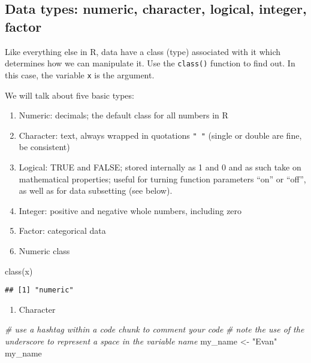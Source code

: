 \documentclass[
]{article}
\newenvironment{Shaded}{\begin{snugshade}}{\end{snugshade}}
\newcommand{\CommentTok}[1]{\textcolor[rgb]{0.56,0.35,0.01}{\textit{#1}}}
\newcommand{\FunctionTok}[1]{\textcolor[rgb]{0.00,0.00,0.00}{#1}}
\newcommand{\NormalTok}[1]{#1}
\newcommand{\OtherTok}[1]{\textcolor[rgb]{0.56,0.35,0.01}{#1}}
\newcommand{\StringTok}[1]{\textcolor[rgb]{0.31,0.60,0.02}{#1}}
\providecommand{\tightlist}{%
  \setlength{\itemsep}{0pt}\setlength{\parskip}{0pt}}
\begin{document}
\hypertarget{data-types-numeric-character-logical-integer-factor}{%
\subsection{Data types: numeric, character, logical, integer,
factor}\label{data-types-numeric-character-logical-integer-factor}}

Like everything else in R, data have a class (type) associated with it
which determines how we can manipulate it. Use the \texttt{class()}
function to find out. In this case, the variable \texttt{x} is the
argument.

We will talk about five basic types:

\begin{enumerate}
\def\labelenumi{\arabic{enumi}.}
\item
  Numeric: decimals; the default class for all numbers in R
\item
  Character: text, always wrapped in quotations \texttt{"\ "} (single or
  double are fine, be consistent)
\item
  Logical: TRUE and FALSE; stored internally as 1 and 0 and as such take
  on mathematical properties; useful for turning function parameters
  ``on'' or ``off'', as well as for data subsetting (see below).
\item
  Integer: positive and negative whole numbers, including zero
\item
  Factor: categorical data
\item
  Numeric class
\end{enumerate}

\begin{Shaded}
\begin{Highlighting}[]
\FunctionTok{class}\NormalTok{(x)}
\end{Highlighting}
\end{Shaded}

\begin{verbatim}
## [1] "numeric"
\end{verbatim}

\begin{enumerate}
\def\labelenumi{\arabic{enumi}.}
\setcounter{enumi}{1}
\tightlist
\item
  Character
\end{enumerate}

\begin{Shaded}
\begin{Highlighting}[]
\CommentTok{\# use a hashtag within a code chunk to comment your code}
\CommentTok{\# note the use of the underscore to represent a space in the variable name}
\NormalTok{my\_name }\OtherTok{\textless{}{-}} \StringTok{"Evan"}
\NormalTok{my\_name}
\end{Highlighting}
\end{Shaded}
\end{document}
